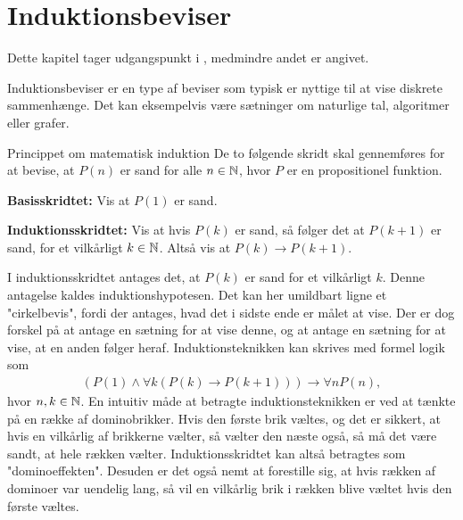 \chapter{Induktionsbeviser}

Dette kapitel tager udgangspunkt i \citep{dmat}, medmindre andet er angivet.

Induktionsbeviser er en type af beviser som typisk er nyttige til at vise diskrete sammenhænge.
Det kan eksempelvis være sætninger om naturlige tal, algoritmer eller grafer.

\begin{theorembox}{Princippet om matematisk induktion}
	De to følgende skridt skal gennemføres for at bevise, at $P(n)$ er sand for alle $n \in \mathbb{N}$, hvor $P$ er en propositionel funktion.

	\textbf{Basisskridtet:} \quad 
	Vis at $P(1)$ er sand.
	
	\textbf{Induktionsskridtet:} \quad 
	Vis at hvis $P(k)$ er sand, så følger det at $P(k + 1)$ er sand, for et vilkårligt $k \in \mathbb{N}$.
	Altså vis at $P \left( k \right) \to P \left( k + 1 \right)$.
\end{theorembox}

I induktionsskridtet antages det, at $P(k)$ er sand for et vilkårligt $k$.
Denne antagelse kaldes induktionshypotesen.
Det kan her umildbart ligne et "cirkelbevis", fordi der antages, hvad det i sidste ende er målet at vise.
Der er dog forskel på at antage en sætning for at vise denne, og at antage en sætning for at vise, at en anden følger heraf.
Induktionsteknikken kan skrives med formel logik som
\begin{align*}
	(P(1) \land \forall k ( P(k) \to P(k + 1))) \to \forall n P(n),
\end{align*}
hvor $n, k \in \mathbb{N}$. En intuitiv måde at betragte induktionsteknikken er ved at tænkte på en række af dominobrikker.
Hvis den første brik væltes, og det er sikkert, at hvis en vilkårlig af brikkerne vælter, så vælter den næste også, så må det være sandt, at hele rækken vælter.
Induktionsskridtet kan altså betragtes som "dominoeffekten".
Desuden er det også nemt at forestille sig, at hvis rækken af dominoer var uendelig lang, så vil en vilkårlig brik i rækken blive væltet hvis den første væltes. 

